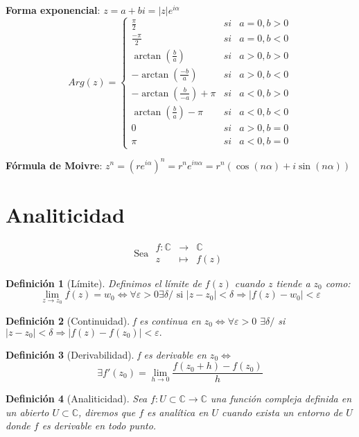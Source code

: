 \documentclass[12pt]{book}
\newtheorem{defi}{Definición}[chapter]
\newcommand{\C}{\mathbb{C}}
\begin{document}
 \textbf{Forma exponencial}: $z = a+bi = |z|e^{i\alpha}$
$$ 
	Arg(z)= \left\{ \begin{array}{lcc}
	\frac{\pi}{2} & si & a=0,b>0 \\
	\frac{-\pi}{2} & si & a=0,b<0\\
	\arctan (\frac{b}{a}) & si & a>0,b>0\\
	-\arctan (\frac{-b}{a}) & si & a>0, b<0\\
	-\arctan (\frac{b}{-a}) + \pi & si &  a<0,b>0\\
	\arctan (\frac{b}{a}) - \pi & si & a<0,b<0\\
	0 & si & a>0,b=0\\
	\pi & si & a<0, b=0
	\end{array}
\right.  
$$


\textbf{Fórmula de Moivre}: $z^n = (re^{i\alpha})^n = r^n e^{in\alpha} = r^n(\cos(n\alpha) + i \sin(n\alpha))$
\newpage
\section{Analiticidad}
$$\text{Sea }\begin{array}{ccc}
f : \mathbb{C} &\longrightarrow& \mathbb{C}\\
z &\longmapsto& f(z)\end{array}$$

\begin{defi}[Límite]
	Definimos el límite de $f(z)$ cuando $z$ tiende a $z_0$ como:
$$ \lim_{z \to z_0} f(z)= w_0 \Leftrightarrow \forall \varepsilon >0 \exists \delta / \text{ si  } |z-z_0| < \delta \Rightarrow |f(z) -w_0|<\varepsilon$$
\end{defi}

\begin{defi}[Continuidad]
f es continua en $z_0 \Leftrightarrow \forall \varepsilon>0$ $\exists \delta /$ si $|z-z_0| < \delta \Rightarrow |f(z)-f(z_0)| < \varepsilon.$
\end{defi}

\begin{defi}[Derivabilidad]
f es derivable en $z_0 \Leftrightarrow$ 
$$\exists f'(z_0) = \lim_{h \to 0} \frac{f(z_0+h)-f(z_0)}{h}$$
\end{defi}


\begin{defi}[Analiticidad]
Sea $f: U \subset \C \longrightarrow \C$ una función compleja definida en un abierto $ U \subset \mathbb{C}$, diremos que $f$ es analítica en $U$ cuando exista un entorno de $U$ donde $f$ es derivable en todo punto.
\end{defi}
\end{document}
